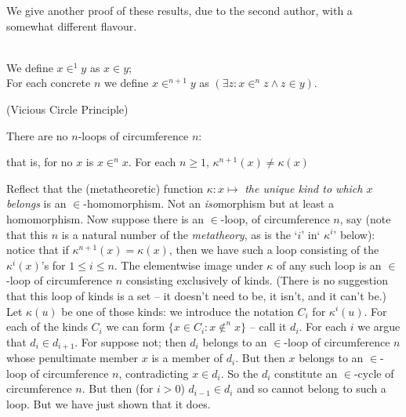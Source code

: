 \documentclass[12pt]{article}
\renewcommand{\smallpara}[1]{\begin{footnotesize}\begin{spacing}{0.8}\begin{quote} #1  \end{quote}\end{spacing}\end{footnotesize}}
\begin{document}
\endproof


We give another proof of these results, due to the second author, with a somewhat different flavour.

\begin{dfn}\mbox{\negthinspace}\\
  We define $x \in ^1 y$ as $x \in y$;\\
  For each concrete $n$ we define $x \in ^{n+1}y$ as $(\exists z:x \in^n z \wedge z \in y)$.  \end{dfn}


\begin{thm} (Vicious Circle Principle)

  There are no $n$-loops of circumference $n$:

  that is, for no $x$ is $x \in^n x$.  For each $n\geq 1$, $\kappa^{n+1}(x) \neq \kappa(x)$  \end{thm}

\Proof

Reflect that the (metatheoretic) function $\kappa:x \mapsto$ {\em the unique   %
kind to which $x$ belongs} is an $\in$-homomorphism.  Not an
{\em iso}morphism but at least a homomorphism.  Now suppose there is an
$\in$-loop, of circumference $n$, say (note that this $n$ is a natural number
of the {\sl metatheory}, as is the `$i$' in` $\kappa^i$' below):  notice that if
$\kappa^{n+1}(x)=\kappa(x)$, then we have such a loop consisting of the
$\kappa^i(x)$'s for $1 \leq i \leq n$.  The elementwise image under
$\kappa$ of any such loop is an $\in$-loop of circumference $n$ consisting
exclusively of kinds.  (There is no suggestion that this loop of kinds is a
set -- it doesn't need to be, it isn't, and it can't be.) Let $\kappa(u)$ be
one of those kinds:  we introduce the notation $C_i$ for $\kappa^i(u)$. For
each of the kinds $C_i$ we can form $\{x \in C_i: x \not\in^n x\}$ -- call
it $d_i$.  For each $i$ we argue that $d_i \in d_{i+1}$. For suppose not;
then $d_i$ belongs to an $\in$-loop of circumference $n$ whose penultimate
member $x$ is a member of $d_i$.  But then $x$ belongs to an $\in$-loop of
circumference $n$, contradicting $x\in d_i$. So the $d_i$ constitute an
$\in$-cycle of circumference $n$. But then (for $i>0$) $d_{i-1} \in d_i$ and so cannot
belong to such a loop.  But we have just shown that it does.
\end{document}
